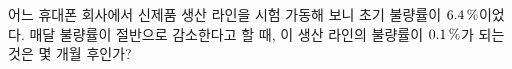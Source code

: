 어느 휴대폰 회사에서 신제품 생산 라인을 시험 가동해 보니 초기 불량률이 $6.4\mkern3mu \%$이었다. 매달 불량률이 절반으로 감소한다고 할 때, 이 생산 라인의 불량률이 $0.1\mkern3mu \%$가 되는 것은 몇 개월 후인가?

